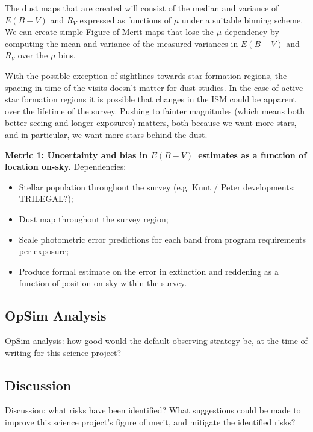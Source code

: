 The dust maps that are created will consist of the median and variance of $E(B-V)$ and $R_V$ expressed as functions of 
$\mu$ under a suitable binning scheme. We can create simple Figure of Merit maps that lose the 
$\mu$ dependency by computing the mean and variance of the measured variances in $E(B-V)$ and $R_V$ 
over the $\mu$ bins.

With the possible exception of sightlines towards star formation
regions, the spacing in time of the visits doesn't matter for dust
studies. In the case of active star formation regions it is possible
that changes in the ISM could be apparent over the lifetime of the
survey.  Pushing to fainter magnitudes (which means both better seeing
and longer exposures) matters, both because we want more stars, and in
particular, we want more stars behind the dust.


{\bf Metric 1: Uncertainty and bias in $E(B-V)$~estimates as a
  function of location on-sky.} Dependencies:

\begin{itemize}
  \item Stellar population throughout the survey (e.g. Knut / Peter developments; TRILEGAL?);
    \item Dust map throughout the survey region;
    \item Scale photometric error predictions for each band from program requirements per exposure;
      \item Produce formal estimate on the error in extinction and reddening as a function of position on-sky within the survey.
\end{itemize}



\subsection{OpSim Analysis}
\label{sec:\secname:analysis}

OpSim analysis: how good would the default observing strategy be, at
the time of writing for this science project?



\subsection{Discussion}
\label{sec:\secname:discussion}

Discussion: what risks have been identified? What suggestions could be
made to improve this science project's figure of merit, and mitigate
the identified risks?



\navigationbar
